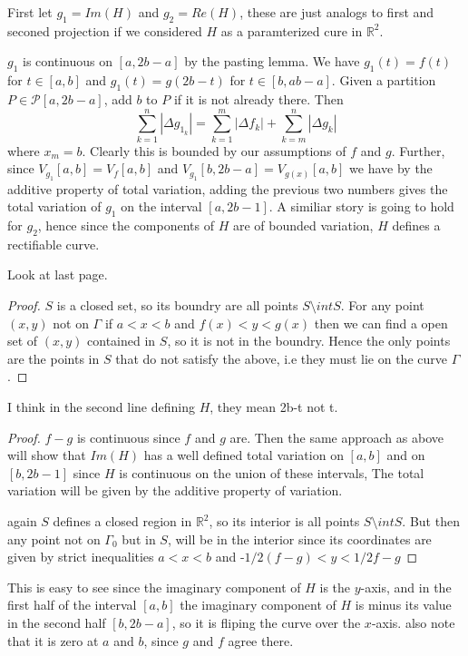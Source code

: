 \documentclass[11pt,largemargins]{homework}
\begin{document}
\begin{alphaparts} 

\questionpart 
First let $g_1 = Im(H)$ and $g_2 = Re(H)$, these are just analogs to first and seconed projection if we considered $H$ as a paramterized cure in $\mathbb{R}^2$. 

$g_1$ is continuous on $[a, 2b-a]$ by the pasting lemma. We have $g_1(t) = f(t)$ for $t \in [a, b]$ and $g_1(t) = g(2b-t)$ for $t \in [b, ab-a]$. 
Given a partition $P \in \mathcal{P}[a, 2b-a]$, add $b$ to $P$ if it is not already there. Then 
\[\sum_{k=1}^n |\Delta g_{1_k} | = \sum_{k=1}^m |\Delta f_k| + \sum_{k = m}^n |\Delta g_k| \] 
where $x_m = b$. Clearly this is bounded by our assumptions of $f$ and $g$.
Further, since $V_{g_1} [a, b]  = V_{f} [a, b]$  and $V_{g_1}[b, 2b-a] = V_{g(x)} [a, b]$ we have by the additive property of total variation, adding the previous two numbers gives the total variation of $g_1$ on the interval $[a, 2b-1]$.
A similiar story is going to hold for $g_2$, hence since the components of $H$ are of bounded variation, $H$ defines a rectifiable curve.
	
\questionpart

Look at last page.  

\questionpart 
\begin{proof} 
	$S$ is a closed set, so its boundry are all points $S \setminus intS$. For any point $(x, y)$ not on $\Gamma$ if $a < x < b$ and $f(x) < y < g(x)$ then we can find a open set of $(x, y)$ contained in $S$, so it is not in the boundry. Hence the only points are the points in $S$ that do not satisfy the above, i.e they must lie on the curve $\Gamma$.
\end{proof}
\questionpart
I think in the second line defining $H$, they mean 2b-t not t.

\begin{proof} 
$f-g$ is continuous since $f$ and $g$ are. Then the same approach as above will show that $Im(H)$ has a well defined total variation on $[a, b]$ and on $[b, 2b -1]$ since $H$ is continuous on the union of these intervals, The total variation will be given by the additive property of variation. 

again $S$ defines a closed region in $\mathbb{R}^2$, so its interior is all points $S \setminus intS$. But then any point not on $\Gamma_0$ but in $S$, 
will be in the interior since its coordinates are given by strict inequalities $a < x < b$ and -$1/2 (f - g) < y < 1/2 f-g$
\end{proof}
\questionpart 
This is easy to see since the imaginary component of $H$ is the $y$-axis, and in the first half of the interval $[a, b]$ the imaginary component of $H$ 
is minus its value in the second half $[b, 2b-a]$, so it is fliping the curve over the $x$-axis. also note that it is zero at $a$ and $b$, since $g$ and $f$ 
agree there. 



\end{alphaparts}
\end{document}
